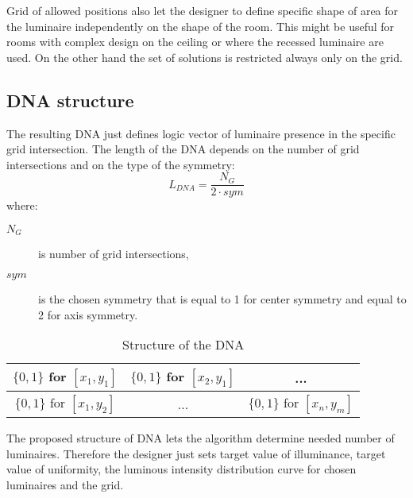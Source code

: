 Grid of allowed positions also let the designer to define specific shape of area for the luminaire independently on the shape of the room. This might be useful for rooms with complex design on the ceiling or where the recessed luminaire are used. On the other hand the set of solutions is restricted always only on the grid.

\subsection{DNA structure}
\label{ssec:dnaStruc}
The resulting DNA just defines logic vector of luminaire presence in the specific grid intersection. The length of the DNA depends on the number of grid intersections and on the type of the symmetry:
\begin{equation}
\label{eq:DNALength}
L_{DNA} = \frac{N_G}{2\cdot sym}
\end{equation}
where:
\begin{description}
	\item[$N_G$] is number of grid intersections,
	\item[$sym$] is the chosen symmetry that is equal to 1 for center symmetry and equal to 2 for axis symmetry.
\end{description}

\begin{table}[htb]
	\renewcommand{\arraystretch}{1.3}
	\caption{Structure of the DNA}
 	\label{tab:strucDNA}
	\centering
  \begin{tabular}{| c | c | c |}
    \hline
    $\lbrace0,1\rbrace$ for $[x_1,y_1]$ & $\lbrace0,1\rbrace$ for $[x_2,y_1]$ & ... \\
    \hline
    $\lbrace0,1\rbrace$ for $[x_1,y_2]$ & ... & $\lbrace0,1\rbrace$ for $[x_n,y_m]$ \\
    \hline
  \end{tabular}
\end{table}

The proposed structure of DNA lets the algorithm determine needed number of luminaires. Therefore the designer just sets target value of illuminance, target value of uniformity, the luminous intensity distribution curve for chosen luminaires and the grid.